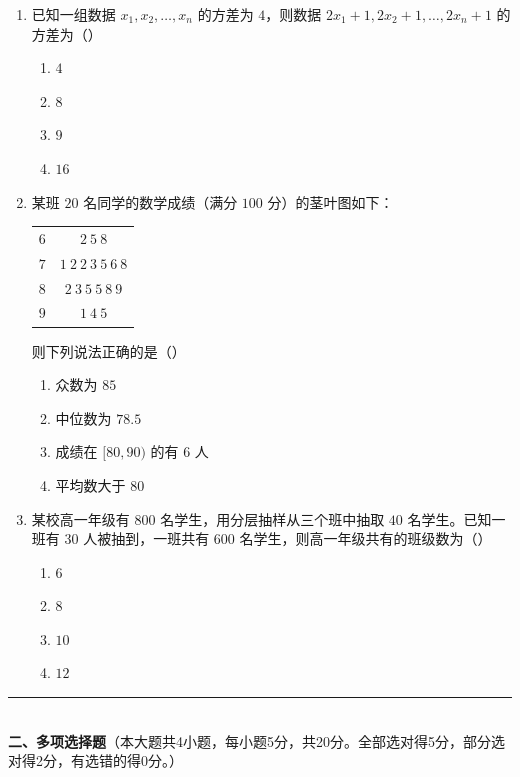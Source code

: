 \documentclass[12pt, a4paper]{ctexart}
\begin{document}
\begin{enumerate}
\item 已知一组数据 $x_1,x_2,\ldots,x_n$ 的方差为 $4$，则数据 $2x_1+1,2x_2+1,\ldots,2x_n+1$ 的方差为（\quad）
  \begin{enumerate}[label=\Alph*., itemsep=0pt]
    \item $4$ \quad \item $8$ \quad \item $9$ \quad \item $16$
  \end{enumerate}

\item 某班 $20$ 名同学的数学成绩（满分 $100$ 分）的茎叶图如下：\\
\begin{center}
\begin{tabular}{c|c}
$6$ & $2\ 5\ 8$ \\
$7$ & $1\ 2\ 2\ 3\ 5\ 6\ 8$ \\
$8$ & $2\ 3\ 5\ 5\ 8\ 9$ \\
$9$ & $1\ 4\ 5$ \\
\end{tabular}
\end{center}
\noindent 则下列说法正确的是（\quad）
  \begin{enumerate}[label=\Alph*., itemsep=0pt]
    \item 众数为 $85$
    \item 中位数为 $78.5$
    \item 成绩在 $[80,90)$ 的有 $6$ 人
    \item 平均数大于 $80$
  \end{enumerate}

\item 某校高一年级有 $800$ 名学生，用分层抽样从三个班中抽取 $40$ 名学生。已知一班有 $30$ 人被抽到，一班共有 $600$ 名学生，则高一年级共有的班级数为（\quad）
  \begin{enumerate}[label=\Alph*., itemsep=0pt]
    \item $6$ \quad \item $8$ \quad \item $10$ \quad \item $12$
  \end{enumerate}
\end{enumerate}

\vspace{6pt}

\noindent\rule{\textwidth}{0.4pt}\\[2pt]
{\large\bfseries 二、多项选择题}（本大题共4小题，每小题5分，共20分。全部选对得5分，部分选对得2分，有选错的得0分。）
\end{document}
